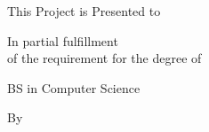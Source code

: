 \begin{center}
\begin{minipage}{0.22\linewidth}\unilogo{2.6cm}\end{minipage}%
\begin{minipage}{0.75\linewidth}\centering{\Large\bfseries \university, \campus}\end{minipage}
\vspace{1.4cm}

{\fontsize{22}{28}\selectfont \projecttitle\par}
\vspace{1.4cm}
{\large This Project is Presented to\par}\vspace{0.8cm}
{\Large \university{} \campus\par}\vspace{0.8cm}
{\large In partial fulfillment\\ of the requirement for the degree of\par}\vspace{0.8cm}
{\LARGE BS in Computer Science\par}\vspace{0.8cm}
{\large By\par}\vspace{0.5cm}
{\large \studentA\\ \regA\\ \studentB\\ \regB\par}\vspace{1cm}
{\LARGE \session\par}
\end{center}
\clearpage


